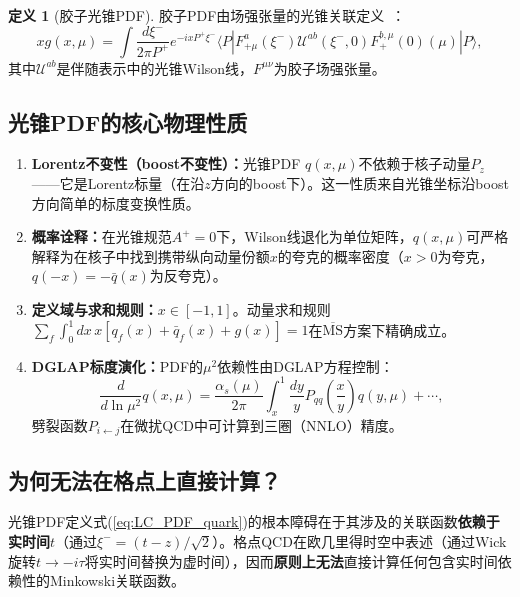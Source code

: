 \documentclass[12pt,a4paper]{ctexart}
\theoremstyle{definition}
\newtheorem{definition}{定义}[section]
\begin{document}
\begin{definition}[胶子光锥PDF]
胶子PDF由场强张量的光锥关联定义~\cite{Fan2018gluonQuasi,Chen2025gluon}：
\begin{equation}
\boxed{x g(x, \mu) = \int \frac{d\xi^-}{2\pi P^+} e^{-ixP^+\xi^-} \langle P | F^{a}_{+\mu}(\xi^-) \mathcal{U}^{ab}(\xi^-, 0) F^{b,\mu}_{+}(0)(\mu) | P \rangle},
\label{eq:LC_PDF_gluon}
\end{equation}
其中$\mathcal{U}^{ab}$是伴随表示中的光锥Wilson线，$F^{\mu\nu}$为胶子场强张量。
\end{definition}

\subsection{光锥PDF的核心物理性质}

\begin{enumerate}[leftmargin=*]
    \item \textbf{Lorentz不变性（boost不变性）：}光锥PDF $q(x,\mu)$不依赖于核子动量$P_z$——它是Lorentz标量（在沿$z$方向的boost下）。这一性质来自光锥坐标沿boost方向简单的标度变换性质。

    \item \textbf{概率诠释：}在光锥规范$A^+ = 0$下，Wilson线退化为单位矩阵，$q(x,\mu)$可严格解释为在核子中找到携带纵向动量份额$x$的夸克的概率密度（$x>0$为夸克，$q(-x) = -\bar q(x)$为反夸克）。

    \item \textbf{定义域与求和规则：}$x \in [-1, 1]$。动量求和规则$\sum_f \int_0^1 dx\, x[q_f(x) + \bar q_f(x) + g(x)] = 1$在$\overline{\text{MS}}$方案下精确成立。

    \item \textbf{DGLAP标度演化：}PDF的$\mu^2$依赖性由DGLAP方程控制：
    \begin{equation}
    \frac{d}{d\ln\mu^2} q(x,\mu) = \frac{\alpha_s(\mu)}{2\pi} \int_x^1 \frac{dy}{y} P_{qq}\!\left(\frac{x}{y}\right) q(y,\mu) + \cdots,
    \label{eq:DGLAP_brief}
    \end{equation}
    劈裂函数$P_{i\leftarrow j}$在微扰QCD中可计算到三圈（NNLO）精度。
\end{enumerate}

\subsection{为何无法在格点上直接计算？}

光锥PDF定义式(\ref{eq:LC_PDF_quark})的根本障碍在于其涉及的关联函数\textbf{依赖于实时间}$t$（通过$\xi^- = (t-z)/\sqrt{2}$）。格点QCD在欧几里得时空中表述（通过Wick旋转$t\to -i\tau$将实时间替换为虚时间），因而\textbf{原则上无法}直接计算任何包含实时间依赖性的Minkowski关联函数。
\end{document}
